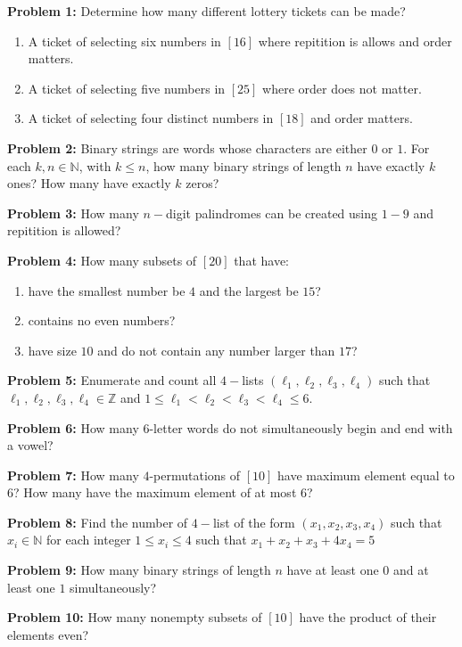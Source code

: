 \documentclass[12pt]{article}
\newcommand{\Z}{\mathbb{Z}}
\newcommand{\prob}[1]{\textbf{Problem #1:}}
\begin{document}
\prob{1} Determine how many different lottery tickets can be made?

\begin{enumerate}[label=(\alph*)]
    \item A ticket of selecting six numbers in $[16]$ where repitition is allows and order matters.
    \item A ticket of selecting five numbers in $[25]$ where order does not matter.
    \item A ticket of selecting four distinct numbers in $[18]$ and order matters.
\end{enumerate}

\prob{2} Binary strings are words whose characters are either $0$ or $1$. For each $k,n \in \mathbb{N}$, with $k \le n$, how many binary strings of length $n$ have exactly $k$ ones? How many have exactly $k$ zeros?

\prob{3} How many $n-$digit palindromes can be created using $1-9$ and repitition is allowed?

\prob{4} How many subsets of $[20]$ that have:

\begin{enumerate}[label=(\alph*)]
    \item have the smallest number be $4$ and the largest be $15$?
    \item contains no even numbers?
    \item have size $10$ and do not contain any number larger than $17$?
\end{enumerate}

\prob{5} Enumerate and count all $4-$lists $(\ell_1, \ell_2, \ell_3, \ell_4)$ such that $\ell_1, \ell_2, \ell_3, \ell_4 \in \Z$ and $1 \le \ell_1 < \ell_2 < \ell_3 < \ell_4 \le 6$.

\prob{6} How many $6$-letter words do not simultaneously begin and end with a vowel?

\prob{7} How many $4$-permutations of $[10]$ have maximum element equal to $6$? How many have the maximum element of at most $6$?

\prob{8} Find the number of $4-$list of the form $(x_1, x_2, x_3, x_4)$ such that $x_i \in \mathbb{N}$ for each integer $1 \le x_i \le 4$ such that $x_1 + x_2 + x_3 + 4x_4 = 5$

\prob{9} How many binary strings of length $n$ have at least one $0$ and at least one $1$ simultaneously?

\prob{10} How many nonempty subsets of $[10]$ have the product of their elements even?
\end{document}
